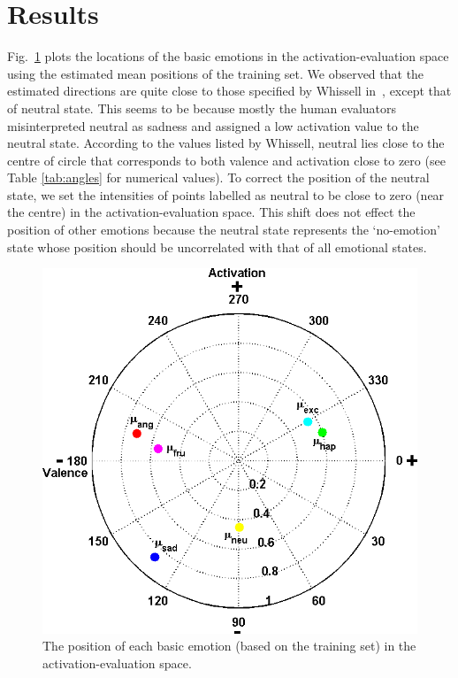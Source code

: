 \documentclass[10pt,journal,cspaper,compsoc]{IEEEtran}
\begin{document}
\section{Results}
\label{sec_results}
Fig.~\ref{fig_emotionspacemodel} plots the locations of the basic emotions in the activation-evaluation space using the estimated mean positions of the training set. We observed that the estimated directions are quite close to those specified by Whissell in~\cite{Whissell89}, except that of neutral state. This seems to be because mostly the human evaluators misinterpreted neutral as sadness and assigned a low activation value to the neutral state. According to the values listed by Whissell, neutral lies close to the centre of circle that corresponds to both valence and activation close to zero (see Table \ref{tab:angles} for numerical values). To correct the position of the neutral state, we set the intensities of points labelled as neutral to be close to zero (near the centre) in the activation-evaluation space. This shift does not effect the position of other emotions because the neutral state represents the `no-emotion' state whose position should be uncorrelated with that of all emotional states.

\begin{figure}[tp!]
      \centering
      \includegraphics[scale=0.45]{figures/Ch6/emotion_space_model_4.png}
      \caption{The position of each basic emotion (based on the training set) in the activation-evaluation space.}
      \label{fig_emotionspacemodel}
\end{figure}
\end{document}
